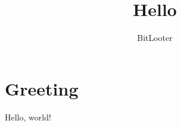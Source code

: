 \documentclass{article}
\begin{document}
\title{Hello}
\author{BitLooter}
\maketitle

\section{Greeting}
Hello, world!
\end{document}
